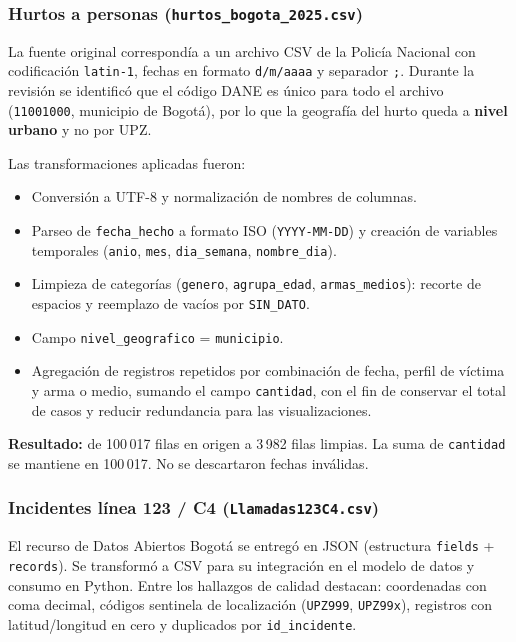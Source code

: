 \documentclass[12pt,letterpaper]{article}
\begin{document}
\subsubsection{Hurtos a personas (\texttt{hurtos\_bogota\_2025.csv})}

La fuente original correspondía a un archivo CSV de la Policía Nacional con codificación \texttt{latin-1}, fechas en formato \texttt{d/m/aaaa} y separador \texttt{;}. Durante la revisión se identificó que el código DANE es único para todo el archivo (\texttt{11001000}, municipio de Bogotá), por lo que la geografía del hurto queda a \textbf{nivel urbano} y no por UPZ.

Las transformaciones aplicadas fueron:
\begin{itemize}[noitemsep, topsep=0pt]
    \item Conversión a UTF-8 y normalización de nombres de columnas.
    \item Parseo de \texttt{fecha\_hecho} a formato ISO (\texttt{YYYY-MM-DD}) y creación de variables temporales (\texttt{anio}, \texttt{mes}, \texttt{dia\_semana}, \texttt{nombre\_dia}).
    \item Limpieza de categorías (\texttt{genero}, \texttt{agrupa\_edad}, \texttt{armas\_medios}): recorte de espacios y reemplazo de vacíos por \texttt{SIN\_DATO}.
    \item Campo \texttt{nivel\_geografico} = \texttt{municipio}.
    \item Agregación de registros repetidos por combinación de fecha, perfil de víctima y arma o medio, sumando el campo \texttt{cantidad}, con el fin de conservar el total de casos y reducir redundancia para las visualizaciones.
\end{itemize}

\textbf{Resultado:} de 100\,017 filas en origen a 3\,982 filas limpias. La suma de \texttt{cantidad} se mantiene en 100\,017. No se descartaron fechas inválidas.

\subsubsection{Incidentes línea 123 / C4 (\texttt{Llamadas123C4.csv})}

El recurso de Datos Abiertos Bogotá se entregó en JSON (estructura \texttt{fields} + \texttt{records}). Se transformó a CSV para su integración en el modelo de datos y consumo en Python. Entre los hallazgos de calidad destacan: coordenadas con coma decimal, códigos sentinela de localización (\texttt{UPZ999}, \texttt{UPZ99x}), registros con latitud/longitud en cero y duplicados por \texttt{id\_incidente}.
\end{document}
